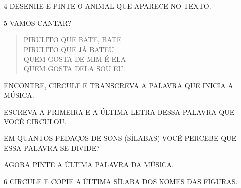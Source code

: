 \num{4} DESENHE E PINTE O ANIMAL QUE APARECE NO TEXTO.

\begin{mdframed}[linewidth=2pt,linecolor=salmao,roundcorner=2pt]
\vspace{16cm}
\end{mdframed}

\pagebreak
\num{5} VAMOS CANTAR?


\begin{myquote}
\begin{verse}
PIRULITO QUE BATE, BATE\\
PIRULITO QUE JÁ BATEU\\
QUEM GOSTA DE MIM É ELA\\
QUEM GOSTA DELA SOU EU.
\end{verse}
\end{myquote}

\begin{escolha}
\item ENCONTRE, CIRCULE E TRANSCREVA A PALAVRA QUE INICIA A MÚSICA.


\item ESCREVA A PRIMEIRA E A ÚLTIMA LETRA DESSA PALAVRA QUE VOCÊ CIRCULOU.


\item EM QUANTOS PEDAÇOS DE SONS (SÍLABAS) VOCÊ PERCEBE QUE ESSA PALAVRA SE DIVIDE?


\item AGORA PINTE A ÚLTIMA PALAVRA DA MÚSICA.
\end{escolha}

\num{6} CIRCULE E COPIE A ÚLTIMA SÍLABA DOS NOMES DAS FIGURAS.

